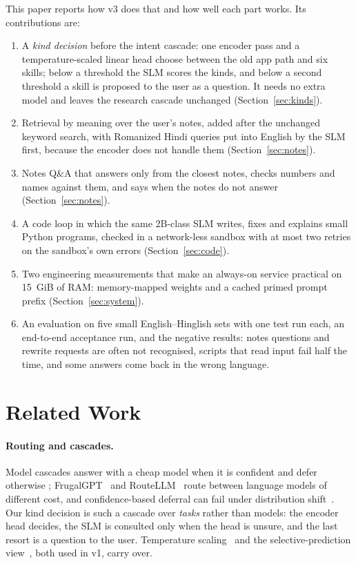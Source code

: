 \documentclass[11pt,a4paper]{article}
\begin{document}
This paper reports how v3 does that and how well each part works. Its contributions are:
\begin{enumerate}
  \item A \emph{kind decision} before the intent cascade: one encoder pass and a temperature-scaled linear head choose
  between the old app path and six skills; below a threshold the SLM scores the kinds, and below a second threshold
  a skill is proposed to the user as a question. It needs no extra model and leaves the research cascade unchanged (Section~\ref{sec:kinds}).
  \item Retrieval by meaning over the user's notes, added after the unchanged keyword search, with Romanized Hindi
  queries put into English by the SLM first, because the encoder does not handle them (Section~\ref{sec:notes}).
  \item Notes Q\&A that answers only from the closest notes, checks numbers and names against them, and says when the
  notes do not answer (Section~\ref{sec:notes}).
  \item A code loop in which the same 2B-class SLM writes, fixes and explains small Python programs, checked in a
  network-less sandbox with at most two retries on the sandbox's own errors (Section~\ref{sec:code}).
  \item Two engineering measurements that make an always-on service practical on 15~GiB of RAM: memory-mapped
  weights and a cached primed prompt prefix (Section~\ref{sec:system}).
  \item An evaluation on five small English--Hinglish sets with one test run each, an end-to-end acceptance run, and the
  negative results: notes questions and rewrite requests are often not recognised, scripts that read input fail half
  the time, and some answers come back in the wrong language.
\end{enumerate}

\section{Related Work}\label{sec:related}

\paragraph{Routing and cascades.} Model cascades answer with a cheap model when it is confident and defer otherwise
\citep{varshney2022modelcascading}; FrugalGPT~\citep{chen2023frugalgpt} and RouteLLM~\citep{ong2024routellm} route
between language models of different cost, and confidence-based deferral can fail under distribution
shift~\citep{jitkrittum2023deferral}. Our kind decision is such a cascade over \emph{tasks} rather than models: the
encoder head decides, the SLM is consulted only when the head is unsure, and the last resort is a question to the user.
Temperature scaling~\citep{guo2017calibration} and the selective-prediction view~\citep{geifman2017selective}, both
used in v1, carry over.
\end{document}
